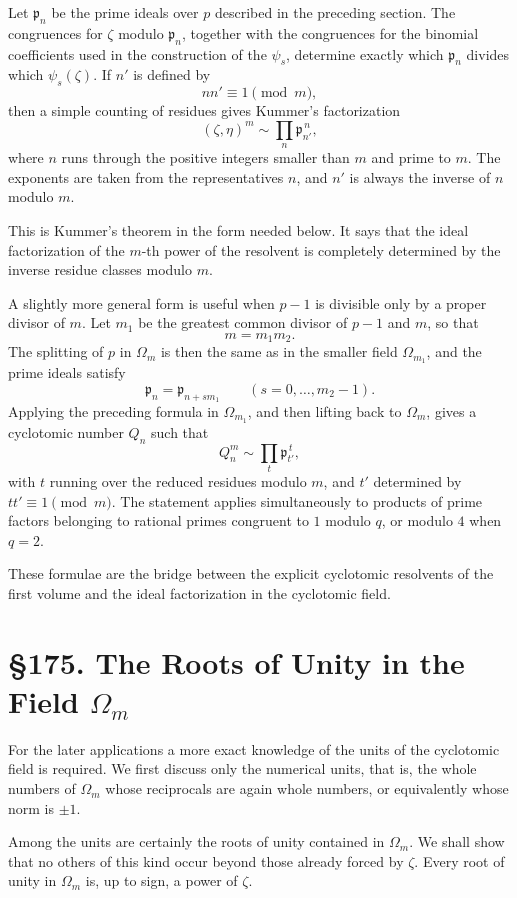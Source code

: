 \documentclass[11pt,a4paper]{book}
\newcommand{\webersection}[2]{\clearpage\section*{\S #1. #2}}
\newcommand{\p}{\mathfrak p}
\begin{document}
Let \(\p_n\) be the prime ideals over \(p\) described in the preceding section.  The congruences for \(\zeta\) modulo \(\p_n\), together with the congruences for the binomial coefficients used in the construction of the \(\psi_s\), determine exactly which \(\p_n\) divides which \(\psi_s(\zeta)\).  If \(n'\) is defined by
\[
  nn'\equiv1\pmod m,
\tag{7}
\]
then a simple counting of residues gives Kummer's factorization
\[
  (\zeta,\eta)^m\sim\prod_n \p_{n'}^{\,n},
\tag{8}
\]
where \(n\) runs through the positive integers smaller than \(m\) and prime to \(m\).  The exponents are taken from the representatives \(n\), and \(n'\) is always the inverse of \(n\) modulo \(m\).

This is Kummer's theorem in the form needed below.  It says that the ideal factorization of the \(m\)-th power of the resolvent is completely determined by the inverse residue classes modulo \(m\).

A slightly more general form is useful when \(p-1\) is divisible only by a proper divisor of \(m\).  Let \(m_1\) be the greatest common divisor of \(p-1\) and \(m\), so that
\[
  m=m_1m_2.
\]
The splitting of \(p\) in \(\Omega_m\) is then the same as in the smaller field \(\Omega_{m_1}\), and the prime ideals satisfy
\[
  \p_{n}=\p_{n+sm_1}\qquad (s=0,\ldots,m_2-1).
\]
Applying the preceding formula in \(\Omega_{m_1}\), and then lifting back to \(\Omega_m\), gives a cyclotomic number \(Q_n\) such that
\[
  Q_n^m\sim \prod_t \p_{t'}^{\,t},
\tag{9}
\]
with \(t\) running over the reduced residues modulo \(m\), and \(t'\) determined by \(tt'\equiv1\pmod m\).  The statement applies simultaneously to products of prime factors belonging to rational primes congruent to \(1\) modulo \(q\), or modulo \(4\) when \(q=2\).

These formulae are the bridge between the explicit cyclotomic resolvents of the first volume and the ideal factorization in the cyclotomic field.


\webersection{175}{The Roots of Unity in the Field \(\Omega_m\)}

For the later applications a more exact knowledge of the units of the cyclotomic field is required.  We first discuss only the numerical units, that is, the whole numbers of \(\Omega_m\) whose reciprocals are again whole numbers, or equivalently whose norm is \(\pm1\).

Among the units are certainly the roots of unity contained in \(\Omega_m\).  We shall show that no others of this kind occur beyond those already forced by \(\zeta\).  Every root of unity in \(\Omega_m\) is, up to sign, a power of \(\zeta\).
\end{document}
